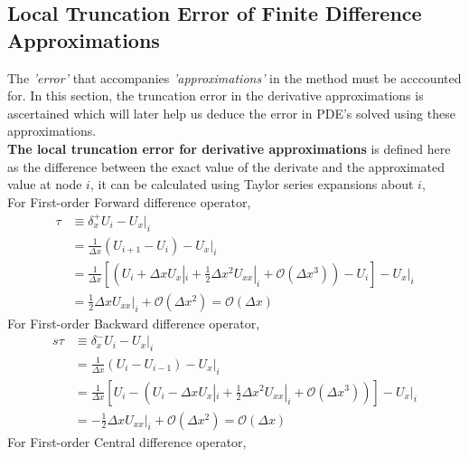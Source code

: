 \documentclass[11pt]{report}
\numberwithin{equation}{section}
\newcommand{\mcm}[1]{\mathcal{#1}}
\begin{document}
\subsection{Local Truncation Error of Finite Difference Approximations}
The \textit{'error'} that accompanies \textit{'approximations'} in the method must be acccounted for. In this section, the truncation error in the derivative approximations is ascertained which will later help us deduce the error in PDE's solved using these approximations.
\\[2mm]
\textbf{The local truncation error for derivative approximations} is defined here as the difference between the exact value of the derivate and the approximated value at node $i$, it can be calculated using Taylor series expansions about $i$,\\[2mm]
For First-order Forward difference operator, 
\begin{align*}
    \tau &\equiv \delta _ x^{+} U_ i - {U_ x}|_ i \\
    &= \frac{1}{{\scriptstyle \Delta } x}\left( U_ {i+1} - U_{i}\right) - {U_ x}|_i \\
    &= \frac{1}{{\scriptstyle \Delta } x}\left[ \left( U_ i + {\scriptstyle \Delta } x{U_ x}|_ i + \frac{1}{2}{\scriptstyle \Delta } x^2{U_{xx}}|_ i + \mcm{O}({\scriptstyle \Delta } x^3)\right) - U_i \right] - {U_ x}|_ i \\
    &= \frac{1}{2}{\scriptstyle \Delta } x{U_{xx}}|_ i + \mcm{O}({\scriptstyle \Delta } x^2) = \mcm{O}(\Delta x)
\end{align*}
For First-order Backward difference operator, 
\begin{align*}s
    \tau &\equiv \delta _ x^{-} U_ i - {U_ x}|_ i \\
    &= \frac{1}{{\scriptstyle \Delta } x}\left( U_ i - U_{i-1}\right) - {U_ x}|_i \\
    &= \frac{1}{{\scriptstyle \Delta } x}\left[ U_ i - \left( U_ i - {\scriptstyle \Delta } x{U_ x}|_ i + \frac{1}{2}{\scriptstyle \Delta } x^2{U_{xx}}|_ i + \mcm{O}({\scriptstyle \Delta } x^3)\right)\right] - {U_ x}|_ i \\
    &= -\frac{1}{2}{\scriptstyle \Delta } x{U_{xx}}|_ i + \mcm{O}({\scriptstyle \Delta } x^2) = \mcm{O}(\Delta x)  
\end{align*}
For First-order Central difference operator,
\end{document}
